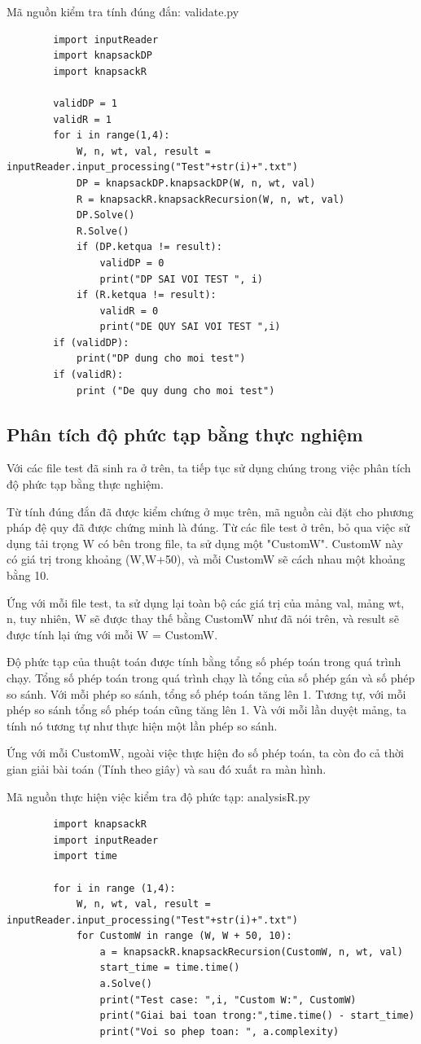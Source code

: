 \documentclass[12pt,a4paper]{report}
\begin{document}
    Mã nguồn kiểm tra tính đúng đắn: 
    validate.py
    \begin{lstlisting}
        import inputReader
        import knapsackDP
        import knapsackR

        validDP = 1
        validR = 1
        for i in range(1,4):
            W, n, wt, val, result = inputReader.input_processing("Test"+str(i)+".txt")
            DP = knapsackDP.knapsackDP(W, n, wt, val)
            R = knapsackR.knapsackRecursion(W, n, wt, val)
            DP.Solve()
            R.Solve()
            if (DP.ketqua != result):
                validDP = 0
                print("DP SAI VOI TEST ", i)
            if (R.ketqua != result):
                validR = 0
                print("DE QUY SAI VOI TEST ",i)
        if (validDP):
            print("DP dung cho moi test")
        if (validR):
            print ("De quy dung cho moi test")
    \end{lstlisting}
    \subsection{Phân tích độ phức tạp bằng thực nghiệm}
    Với các file test đã sinh ra ở trên, ta tiếp tục sử dụng chúng trong việc phân
    tích độ phức tạp bằng thực nghiệm.

    Từ tính đúng đắn đã được kiểm chứng ở mục trên, mã nguồn cài đặt cho phương 
    pháp đệ quy đã được chứng minh là đúng. Từ các file test ở trên, bỏ qua việc sử 
    dụng tải trọng W có bên trong file, ta sử dụng một "CustomW". CustomW này 
    có giá trị trong khoảng (W,W+50), và mỗi CustomW sẽ cách nhau một khoảng bằng 10. 

    Ứng với mỗi file test, ta sử dụng lại toàn bộ các giá trị của mảng val, mảng wt,
    n, tuy nhiên, W sẽ được thay thế bằng CustomW như đã nói trên, và result sẽ được
    tính lại ứng với mỗi W = CustomW.

    Độ phức tạp của thuật toán được tính bằng tổng số phép toán trong quá trình chạy.
    Tổng số phép toán trong quá trình chạy là tổng của số phép gán và số phép so sánh.
    Với mỗi phép so sánh, tổng số phép toán tăng lên 1. Tương tự, với mỗi phép so sánh
    tổng số phép toán cũng tăng lên 1. Và với mỗi lần duyệt mảng, ta tính nó tương tự 
    như thực hiện một lần phép so sánh.

    Ứng với mỗi CustomW, ngoài việc thực hiện đo số phép toán, ta còn đo cả thời gian 
    giải bài toán (Tính theo giây) và sau đó xuất ra màn hình.

    
    Mã nguồn thực hiện việc kiểm tra độ phức tạp:
    analysisR.py
    \begin{lstlisting}
        import knapsackR
        import inputReader
        import time

        for i in range (1,4):
            W, n, wt, val, result = inputReader.input_processing("Test"+str(i)+".txt")
            for CustomW in range (W, W + 50, 10):
                a = knapsackR.knapsackRecursion(CustomW, n, wt, val)
                start_time = time.time()
                a.Solve()
                print("Test case: ",i, "Custom W:", CustomW)
                print("Giai bai toan trong:",time.time() - start_time)
                print("Voi so phep toan: ", a.complexity)
            \end{lstlisting}
\end{document}
